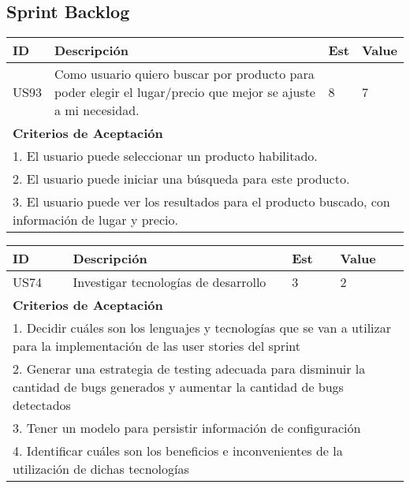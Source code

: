 


\subsection{Sprint Backlog}

\bigskip
\begin{tabular}{|p{1cm}|p{10cm}|p{1cm}|p{1cm}|}
\hline
\hline
\textbf{ID}&\textbf{Descripción}&\textbf{Est}&\textbf{Value}\\
\hline
\hline
US93&Como usuario quiero buscar por producto para poder elegir el lugar/precio que mejor se ajuste a mi necesidad.& 8& 7\\
\hline
\hline
\multicolumn{4}{|p{13cm}|}{ \textbf{Criterios de Aceptación}} \\
\hline
\hline
\multicolumn{4}{|p{13cm}|}{1. El usuario puede seleccionar un producto habilitado.}\\
\multicolumn{4}{|p{13cm}|}{2. El usuario puede iniciar una búsqueda para este producto.}\\
\multicolumn{4}{|p{13cm}|}{3. El usuario puede ver los resultados para el producto buscado, con información de lugar y precio.}\\
\hline
\hline
\end{tabular}

\bigskip
\begin{tabular}{|p{1cm}|p{10cm}|p{1cm}|p{1cm}|}
\hline
\hline
\textbf{ID}&\textbf{Descripción}&\textbf{Est}&\textbf{Value}\\
\hline
\hline
US74&Investigar tecnologías de desarrollo&3&2\\
\hline
\hline
\multicolumn{4}{|p{13cm}|}{ \textbf{Criterios de Aceptación}} \\
\hline
\hline
\multicolumn{4}{|p{13cm}|}{1. Decidir cuáles son los lenguajes y tecnologías que se van a utilizar para la implementación de las user stories del sprint}\\
\multicolumn{4}{|p{13cm}|}{2. Generar una estrategia de testing adecuada para disminuir la cantidad de bugs generados y aumentar la cantidad de bugs detectados}\\
\multicolumn{4}{|p{13cm}|}{3. Tener un modelo para persistir información de configuración}\\
\multicolumn{4}{|p{13cm}|}{4. Identificar cuáles son los beneficios e inconvenientes de la utilización de dichas tecnologías}\\
\hline
\hline
\end{tabular}

